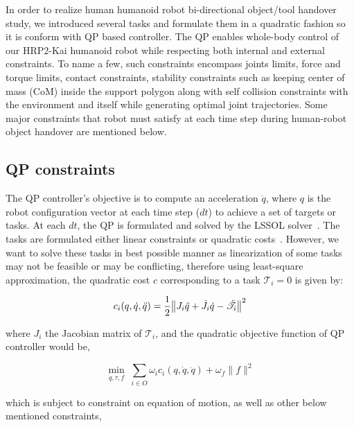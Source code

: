 In order to realize human humanoid robot bi-directional object/tool handover study, we introduced several tasks and formulate them in a quadratic fashion so it is conform with QP based controller. The QP enables whole-body control of our HRP2-Kai humanoid robot while respecting both internal and external constraints. To name a few, such constraints encompass joints limits, force and torque limits, contact constraints, stability constraints such as keeping center of mass (CoM) inside the support polygon along with self collision constraints with the environment and itself while generating optimal joint trajectories. Some major constraints that robot must satisfy at each time step during human-robot object handover are mentioned below.


\subsection{QP constraints}\label{QPConstraints}

The QP controller's objective is to compute an acceleration $\ddot{q}$, where $q$ is the robot configuration vector at each time step ($dt$)  to achieve a set of targets or tasks. At each $dt$, the QP is formulated and solved by the LSSOL solver~\cite{gill1986fortran}. The tasks are formulated either linear constraints or quadratic costs~\cite{ladder-HRP-2Kai}. However, we want to solve these tasks in best possible manner as linearization of some tasks may not be feasible or may be conflicting, therefore using least-square approximation, the quadratic cost $c$ corresponding to a task $\mathscr{T}_i =0$ is given by:



\begin{equation}
c_i(q,\dot{q}, \ddot{q})  = \frac{1}{2}{\norm{ J_i\ddot{q} + \dot{J}_i\dot{q} -\ddot{\mathscr{T}}_i }^2 }
\end{equation}

where $J_i$ the Jacobian matrix of $\mathscr{T}_i$, and the quadratic objective function of QP controller would be,

\begin{equation}\label{qp equation}
\min_{\ddot{q},\tau,f} \; \sum_{i\in O} \omega_i c_i(q,\dot{q},\ddot{q}) + \omega_{f}\lVert f\rVert^2
\end{equation}

which is subject to constraint on equation of motion, as well as other below mentioned constraints,

